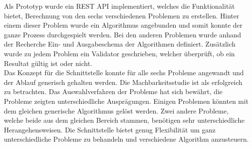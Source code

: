 Als Prototyp wurde ein REST API implementiert, welches die Funktionalität bietet, Berechnung von den sechs verschiedenen Problemen zu erstellen. Hinter einem dieser Problem wurde ein 
Algorithmus angebunden und somit konnte der ganze Prozess durchgespielt werden. Bei den anderen Problemen wurde anhand der Recherche Ein- und Ausgabeschema der Algorithmen definiert. 
Zusätzlich wurde zu jedem Problem ein Validator geschrieben, welcher überprüft, ob ein Resultat gültig ist oder nicht.\\

Das Konzept für die Schnittstelle konnte für alle sechs Probleme angewandt und der Ablauf generisch gehalten werden. Die Machbarkeitsstudie ist als erfolgreich zu betrachten. Das 
Auswahlverfahren der Probleme hat sich bewährt, die Probleme zeigten unterschiedliche Ausprägungen. Einigen Problemen könnten mit dem gleichen generische Algorithmus gelöst werden. Zwei 
andere Probleme, welche beide aus dem gleichen Bereich stammen, benötigen sehr unterschiedliche Herangehensweisen. Die Schnittstelle bietet genug Flexibilität um ganz unterschiedliche 
Probleme zu behandeln und verschiedene Algorithm anzusteuern.